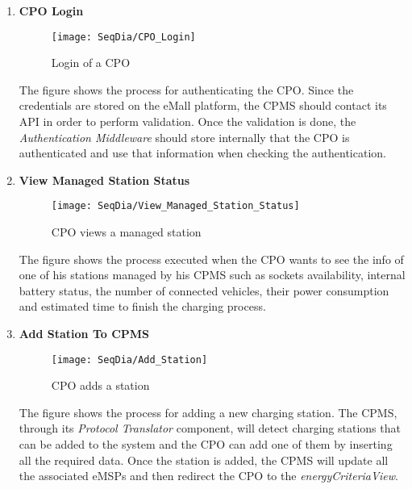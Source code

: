 \begin{enumerate}
        \newpage
        \item \textbf{CPO Login}
        \begin{figure}[H]
            \begin{center}
            \texttt{[image: SeqDia/CPO\_Login]}
            \caption{Login of a CPO}
            \label{fig:CPOLogin}
            \end{center}
        \end{figure}
        The figure shows the process for authenticating the CPO. Since the credentials are stored on the eMall platform, the CPMS should contact its API in order to perform validation. Once the validation is done, the \textit{Authentication Middleware} should store internally that the CPO is authenticated and use that information when checking the authentication. 
        \newpage
        \item \textbf{View Managed Station Status}
        \begin{figure}[H]
            \begin{center}
            \texttt{[image: SeqDia/View\_Managed\_Station\_Status]}
            \caption{CPO views a managed station}
            \label{fig:ManageStation}
            \end{center}
        \end{figure}
        The figure shows the process executed when the CPO wants to see the info of one of his stations managed by his CPMS such as sockets availability, internal battery status, the number of connected vehicles, their power consumption and estimated time to finish the charging process.
        \newpage
        \item \textbf{Add Station To CPMS}
        \begin{figure}[H]
            \begin{center}
            \texttt{[image: SeqDia/Add\_Station]}
            \caption{CPO adds a station}
            \label{fig:AddStation}
            \end{center}
        \end{figure}
        The figure shows the process for adding a new charging station. The CPMS, through its \textit{Protocol Translator} component, will detect charging stations that can be added to the system and the CPO can add one of them by inserting all the required data. Once the station is added, the CPMS will update all the associated eMSPs and then redirect the CPO to the \textit{energyCriteriaView}.

\end{enumerate}
